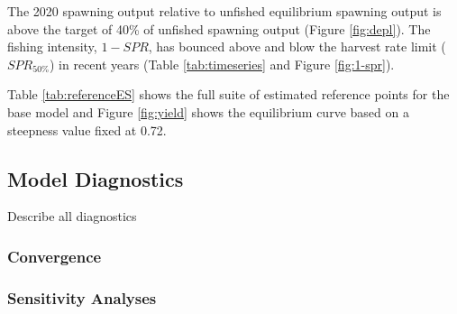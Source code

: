 \documentclass[11pt,
  english,
  a4paper,
]{article}
\begin{document}
\leavevmode\tagmcend\tagstructend\par


The 2020 spawning output relative to unfished equilibrium spawning output is above the target of 40\% of unfished spawning output (Figure \ref{fig:depl}). The fishing intensity, {\(1-SPR\)\leavevmode\tagmcend\tagstructend}, has bounced above and blow the harvest rate limit ({\(SPR_{50\%}\)\leavevmode\tagmcend\tagstructend}) in recent years (Table \ref{tab:timeseries} and Figure \ref{fig:1-spr}).

\leavevmode\tagmcend\tagstructend\par


Table \ref{tab:referenceES} shows the full suite of estimated reference points for the base model and Figure \ref{fig:yield} shows the equilibrium curve based on a steepness value fixed at 0.72.

\leavevmode\tagmcend\tagstructend\par


\hypertarget{model-diagnostics}{%
\subsection{Model Diagnostics}\label{model-diagnostics}}

\leavevmode\tagmcend\tagstructend


Describe all diagnostics

\leavevmode\tagmcend\tagstructend\par


\hypertarget{convergence-1}{%
\subsubsection{Convergence}\label{convergence-1}}

\leavevmode\tagmcend\tagstructend


\hypertarget{sensitivity-analyses}{%
\subsubsection{Sensitivity Analyses}\label{sensitivity-analyses}}
\end{document}
